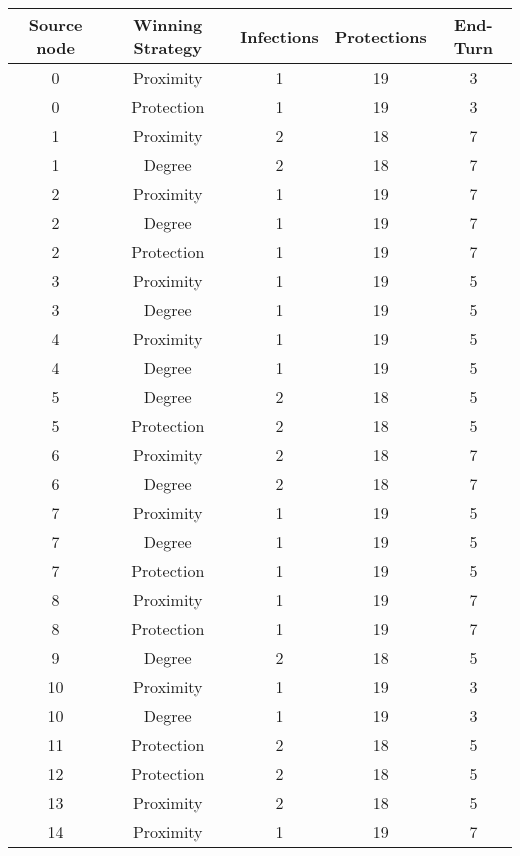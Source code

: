 \documentclass[results.tex]{subfiles}
\begin{document}
\begin{center}
  \begin{tabular}{| c || c | c | c | c |}
    \hline
    {\bfseries Source node} & {\bfseries Winning Strategy} & {\bfseries Infections} & {\bfseries Protections} & {\bfseries End-Turn} \\  %
    \hline\hline
    0 & Proximity & 1 & 19 & 3 \\
    \hline
    0 & Protection & 1 & 19 & 3 \\
    \hline
    1 & Proximity & 2 & 18 & 7 \\
    \hline
    1 & Degree & 2 & 18 & 7 \\
    \hline 
    2 & Proximity & 1 & 19 & 7 \\
    \hline
    2 & Degree & 1 & 19 & 7 \\
    \hline
    2 & Protection & 1 & 19 & 7 \\
    \hline
    3 & Proximity & 1 & 19 & 5 \\
    \hline
    3 & Degree & 1 & 19 & 5 \\
    \hline
    4 & Proximity & 1 & 19 & 5 \\
    \hline
    4 & Degree & 1 & 19 & 5 \\
    \hline
    5 & Degree & 2 & 18 & 5 \\
    \hline
    5 & Protection & 2 & 18 & 5 \\
    \hline
    6 & Proximity & 2 & 18 & 7 \\
    \hline
    6 & Degree & 2 & 18 & 7 \\
    \hline
    7 & Proximity & 1 & 19 & 5 \\
    \hline
    7 & Degree & 1 & 19 & 5 \\
    \hline
    7 & Protection & 1 & 19 & 5 \\
    \hline
    8 & Proximity & 1 & 19 & 7 \\
    \hline
    8 & Protection & 1 & 19 & 7 \\
    \hline
    9 & Degree & 2 & 18 & 5 \\
    \hline
    10 & Proximity & 1 & 19 & 3 \\
    \hline
    10 & Degree & 1 & 19 & 3 \\
    \hline
    11 & Protection & 2 & 18 & 5 \\
    \hline
    12 & Protection & 2 & 18 & 5 \\
    \hline
    13 & Proximity & 2 & 18 & 5 \\
    \hline
    14 & Proximity & 1 & 19 & 7 \\

\end{tabular}
\end{center}
\end{document}
